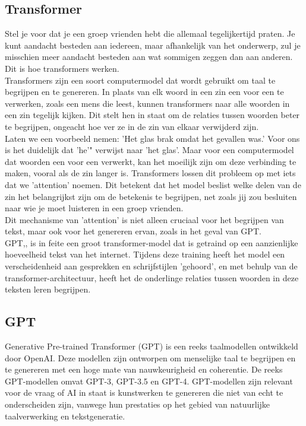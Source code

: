 \subsection{Transformer}
Stel je voor dat je een groep vrienden hebt die allemaal tegelijkertijd praten. Je kunt aandacht besteden aan iedereen, maar afhankelijk van het onderwerp, zul je misschien meer aandacht besteden aan wat sommigen zeggen dan aan anderen. Dit is hoe transformers werken. \\

Transformers zijn een soort computermodel dat wordt gebruikt om taal te begrijpen en te genereren. In plaats van elk woord in een zin een voor een te verwerken, zoals een mens die leest, kunnen transformers naar alle woorden in een zin tegelijk kijken. Dit stelt hen in staat om de relaties tussen woorden beter te begrijpen, ongeacht hoe ver ze in de zin van elkaar verwijderd zijn. \\

Laten we een voorbeeld nemen: 'Het glas brak omdat het gevallen was.' Voor ons is het duidelijk dat 'he'" verwijst naar 'het glas'. Maar voor een computermodel dat woorden een voor een verwerkt, kan het moeilijk zijn om deze verbinding te maken, vooral als de zin langer is. Transformers lossen dit probleem op met iets dat we 'attention' noemen. Dit betekent dat het model beslist welke delen van de zin het belangrijkst zijn om de betekenis te begrijpen, net zoals jij zou besluiten naar wie je moet luisteren in een groep vrienden.\\ 

Dit mechanisme van 'attention' is niet alleen cruciaal voor het begrijpen van tekst, maar ook voor het genereren ervan, zoals in het geval van GPT. \\

GPT,, is in feite een groot transformer-model dat is getraind op een aanzienlijke hoeveelheid tekst van het internet. Tijdens deze training heeft het model een verscheidenheid aan gesprekken en schrijfstijlen 'gehoord', en met behulp van de transformer-architectuur, heeft het de onderlinge relaties tussen woorden in deze teksten leren begrijpen. \\

\subsection{GPT}
\label{sub:GPT}
Generative Pre-trained Transformer (GPT) is een reeks taalmodellen ontwikkeld door OpenAI. Deze modellen zijn ontworpen om menselijke taal te begrijpen en te genereren met een hoge mate van nauwkeurigheid en coherentie. De reeks GPT-modellen omvat GPT-3, GPT-3.5 en GPT-4. GPT-modellen zijn relevant voor de vraag of AI in staat is kunstwerken te genereren die niet van echt te onderscheiden zijn, vanwege hun prestaties op het gebied van natuurlijke taalverwerking en tekstgeneratie. \\

